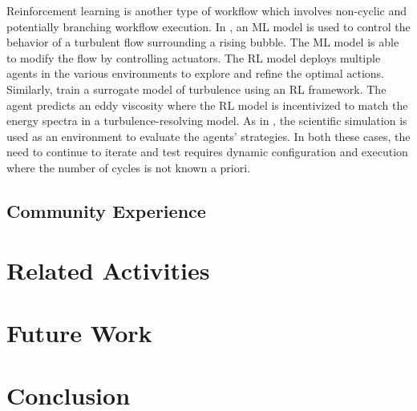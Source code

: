 \documentclass[utf8]{FrontiersinVancouver} %
\begin{document}
Reinforcement learning is another type of workflow which involves non-cyclic
and potentially branching workflow execution. In \citep{Font2024}, an ML
model is used to control the behavior of a turbulent flow surrounding a rising
bubble. The ML model is able to modify the flow by controlling actuators.
The RL model deploys multiple agents in the various environments to explore
and refine the optimal actions. Similarly, \citep{Kurz2022} train a surrogate
model of turbulence using an RL framework. The agent predicts an eddy viscosity
where the RL model is incentivized to match the energy spectra in a
turbulence-resolving model. As in \citep{Font24}, the scientific simulation is
used as an environment to evaluate the agents' strategies. In both these cases,
the need to continue to iterate and test requires dynamic configuration and
execution where the number of cycles is not known a priori.



\subsection{Community Experience}

\section{Related Activities}


\section{Future Work}


\section{Conclusion}



\clearpage
\end{document}
